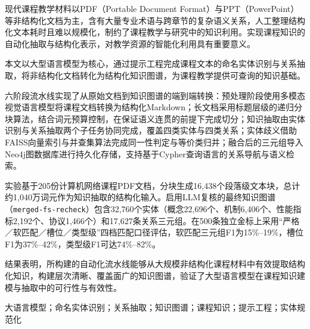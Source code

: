 \abstractch

现代课程教学材料以PDF（Portable Document Format）与PPT（PowerPoint）等非结构化文档为主，含有大量专业术语与跨章节的复杂语义关系，人工整理结构化文本耗时且难以规模化，制约了课程教学与研究中的知识利用。实现课程知识的自动化抽取与结构化表示，对教学资源的智能化利用具有重要意义。

本文以大型语言模型为核心，通过提示工程完成课程文本的命名实体识别与关系抽取，将非结构化文档转化为结构化知识图谱，为课程教学提供可查询的知识基础。

六阶段流水线实现了从原始文档到知识图谱的端到端转换：预处理阶段使用多模态视觉语言模型将课程文档转换为结构化Markdown；长文档采用标题层级的递归分块算法，结合词元预算控制，在保证语义连贯的前提下完成切分；知识抽取由实体识别与关系抽取两个子任务协同完成，覆盖四类实体与四类关系；实体歧义借助FAISS向量索引与并查集算法完成同一性判定与等价类归并；融合后的三元组导入Neo4j图数据库进行持久化存储，支持基于Cypher查询语言的关系导航与语义检索。

实验基于205份计算机网络课程PDF文档，分块生成16,438个段落级文本块，总计约1,040万词元作为知识抽取的结构化输入。启用LLM复核的最终知识图谱（\texttt{merged-fs-recheck}）包含32,760个实体（概念22,696个、机制6,406个、性能指标2,192个、协议1,466个）和17,627条关系三元组。在500条独立金标上采用“严格／软匹配／槽位／类型级”四档匹配口径评估，软匹配三元组F1为15\%--19\%，槽位F1为37\%--42\%，类型级F1可达74\%--82\%。

结果表明，所构建的自动化流水线能够从大规模非结构化课程材料中有效提取结构化知识，构建层次清晰、覆盖面广的知识图谱，验证了大型语言模型在课程知识建模与抽取中的可行性与有效性。

\vspace{\baselineskip}

\keywordsch 大语言模型；命名实体识别；关系抽取；知识图谱；课程知识；提示工程；实体规范化
